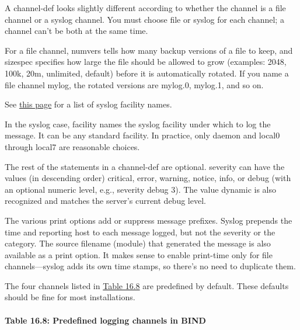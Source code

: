A {channel-def} looks slightly different according to whether the
channel is a file channel or a syslog channel. You must choose {file} or
{syslog} for each channel; a channel can't be both at the same
time.\protect\hypertarget{part0024_split_070.htmlux5cux23_idIndexMarker2286}{}{}


For a file channel, {numvers} tells how many backup versions of a file
to keep, and {sizespec} specifies how large the file should be allowed
to grow (examples: {2048}, {100k}, {20m}, {unlimited}, {default}) before
it is automatically rotated. If you name a file channel {mylog}, the
rotated versions are {mylog.0}, {mylog.1}, and so on.

\leavevmode\hypertarget{part0024_split_070.htmlux5cux23_idContainer1057}{}%
See
\protect\hyperlink{part0017_split_012.htmlux5cux23_idTextAnchor513}{this
page} for a list of syslog facility names.

In the syslog case, {facility} names the syslog facility under which to
log the message. It can be any standard facility. In practice, only
daemon and local0 through local7 are reasonable choices.

The rest of the statements in a {channel-def} are optional. {severity}
can have the values (in descending order) {critical}, {error},
{warning}, {notice}, {info}, or {debug} (with an optional numeric level,
e.g., {severity debug 3}). The value {dynamic} is also recognized and
matches the server's current debug level.

The various {print} options add or suppress message prefixes. Syslog
prepends the time and reporting host to each message logged, but not the
severity or the category. The source filename (module) that generated
the message is also available as a {print} option. It makes sense to
enable {print-time} only for file channels---syslog adds its own time
stamps, so there's no need to duplicate them.

The four channels listed in
\protect\hyperlink{part0024_split_070.htmlux5cux23_idTextAnchor958}{Table
16.8} are predefined by default. These defaults should be fine for most
installations.

\paragraph[{Table 16.8: }Predefined logging channels in
BIND]{\texorpdfstring{{Table 16.8:
}\protect\hypertarget{part0024_split_070.htmlux5cux23_idTextAnchor958}{}{}Predefined
logging channels in
BIND}{Table 16.8: Predefined logging channels in BIND}}

